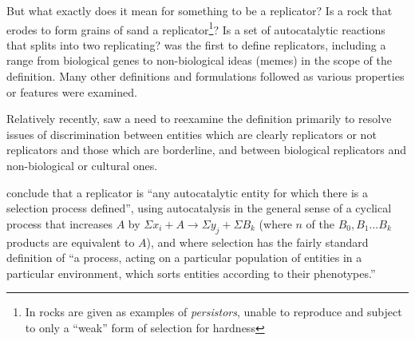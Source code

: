 But what exactly does it mean for something to be a replicator? Is a rock that erodes to form grains of sand a replicator\footnote{In \textcite{Bourrat2015} rocks are given as examples of \emph{persistors}, unable to reproduce and subject to only a ``weak'' form of selection for hardness}? Is a set of autocatalytic reactions that splits into two replicating? \Textcite{Dawkins1976} was the first to define replicators, including a range from biological genes to non-biological ideas (memes) in the scope of the definition. Many other definitions and formulations followed as various properties or features were examined. 

%
%

Relatively recently, \textcite{Zachar2010} saw a need to reexamine the definition primarily to resolve issues of discrimination between entities which are clearly replicators or not replicators and those which are borderline, and between biological replicators and non-biological or cultural ones. 


\Textcite{Zachar2010} conclude that a replicator is ``any autocatalytic entity for which there is a selection process defined'', using autocatalysis in the general sense of a cyclical process that increases $A$ by $\Sigma x_i + A\rightarrow \Sigma y_j + \Sigma B_k$ (where $n$ of the ${B_0, B_1...B_k}$ products are equivalent to $A$), and where selection has the fairly standard definition of ``a process, acting on a particular population of entities in a particular environment, which sorts entities according to their phenotypes.'' \parencite[p.21]{Zachar2010}

